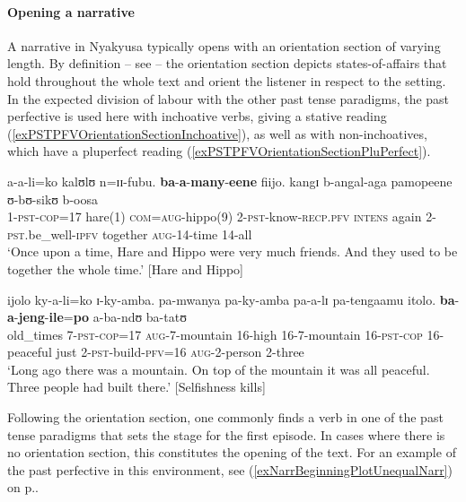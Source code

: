  
\paragraph{Opening a narrative}\label{PastPFVNarrativeDiscourseOpenings}
A narrative in Nyakyusa typically opens with an orientation section of varying length. By definition  -- see  -- the orientation section depicts states-of-affairs that hold throughout the whole text and orient the listener in respect to the setting. In the expected division of labour with the other past tense paradigms, the past perfective is used here with inchoative verbs, giving a stative reading (\ref{exPSTPFVOrientationSectionInchoative}), as well as with non-inchoatives, which have a pluperfect reading (\ref{exPSTPFVOrientationSectionPluPerfect}).

\begin{exe}
\ex \label{exPSTPFVOrientationSectionInchoative}
\gll a-a-li=ko kalʊlʊ n=ɪɪ-fubu. \textbf{ba}-\textbf{a}-\textbf{many}-\textbf{eene} fiijo. kangɪ b-angal-aga pamopeene ʊ-bʊ-sikʊ b-oosa\\
1-\textsc{pst}-\textsc{cop}=17 hare(1) \textsc{com}=\textsc{aug}-hippo(9) 2-\textsc{pst}-know-\textsc{recp.pfv} \textsc{intens} again 2-\textsc{pst}.be\_well-\textsc{ipfv} together \textsc{aug}-14-time 14-all\\
\glt \lq Once upon a time, Hare and Hippo were very much friends. And they used to be together the whole time.' [Hare and Hippo]

\ex \label{exPSTPFVOrientationSectionPluPerfect}
\gll ijolo ky-a-li=ko ɪ-ky-amba. pa-mwanya pa-ky-amba pa-a-lɪ pa-tengaamu itolo. \textbf{ba}-\textbf{a}-\textbf{jeng}-\textbf{ile}=\textbf{po} a-ba-ndʊ ba-tatʊ\\
old\_times 7-\textsc{pst}-\textsc{cop}=17 \textsc{aug}-7-mountain 16-high 16-7-mountain 16-\textsc{pst}-\textsc{cop} 16-peaceful just 2-\textsc{pst}-build-\textsc{pfv}=16 \textsc{aug}-2-person 2-three\\
\glt \lq Long ago there was a mountain. On top of the mountain it was all peaceful. Three people had built there.' [Selfishness kills]
\end{exe}%

Following the orientation section, one commonly finds a verb in one of the past tense paradigms that sets the stage for the first episode. In cases where there is no orientation section, this constitutes the opening of the text. For an example of the past perfective in this environment, see (\ref{exNarrBeginningPlotUnequalNarr}) on p.\nobreakspace\pageref{exNarrBeginningPlotUnequalNarr}.

